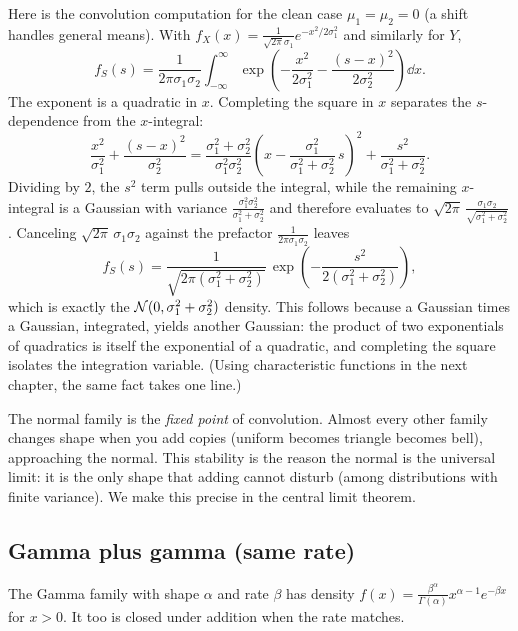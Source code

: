\begin{whybox}
Here is the convolution computation for the clean case
$\mu_1=\mu_2=0$ (a shift handles general means). With
$f_X(x)=\frac{1}{\sqrt{2\pi}\sigma_1}e^{-x^2/2\sigma_1^2}$ and similarly
for $Y$,
\[
f_S(s) = \frac{1}{2\pi\sigma_1\sigma_2}\int_{-\infty}^{\infty}
   \exp\!\left(-\frac{x^2}{2\sigma_1^2}-\frac{(s-x)^2}{2\sigma_2^2}\right)\dd x.
\]
The exponent is a quadratic in $x$. Completing the square in $x$ separates
the $s$-dependence from the $x$-integral:
\[
\frac{x^2}{\sigma_1^2} + \frac{(s-x)^2}{\sigma_2^2}
  = \frac{\sigma_1^2+\sigma_2^2}{\sigma_1^2\sigma_2^2}
    \left(x - \frac{\sigma_1^2}{\sigma_1^2+\sigma_2^2}\,s\right)^{\!2}
    + \frac{s^2}{\sigma_1^2+\sigma_2^2}.
\]
Dividing by $2$, the $s^2$ term pulls outside the integral, while the remaining
$x$-integral is a Gaussian with variance $\frac{\sigma_1^2\sigma_2^2}{\sigma_1^2+\sigma_2^2}$
and therefore evaluates to $\sqrt{2\pi}\,\frac{\sigma_1\sigma_2}{\sqrt{\sigma_1^2+\sigma_2^2}}$.
Canceling $\sqrt{2\pi}\,\sigma_1\sigma_2$ against the prefactor $\frac{1}{2\pi\sigma_1\sigma_2}$ leaves
\[
f_S(s) = \frac{1}{\sqrt{2\pi(\sigma_1^2+\sigma_2^2)}}\,
         \exp\!\left(-\frac{s^2}{2(\sigma_1^2+\sigma_2^2)}\right),
\]
which is exactly the $\mathcal{N}(0,\sigma_1^2+\sigma_2^2)$ density. This follows
because a Gaussian times a Gaussian, integrated, yields another Gaussian:
the product of two exponentials of quadratics is itself the exponential of a
quadratic, and completing the square isolates the integration variable. (Using
characteristic functions in the next chapter, the same fact takes one
line.)
\end{whybox}

\begin{aestheticbox}
The normal family is the \emph{fixed point} of convolution. Almost every
other family changes shape when you add copies (uniform becomes triangle
becomes bell), approaching the normal. This stability is the
reason the normal is the universal limit: it is the only shape that
adding cannot disturb (among distributions with finite variance). We make
this precise in the central limit theorem.
\end{aestheticbox}

\subsection{Gamma plus gamma (same rate)}

The Gamma family with shape $\alpha$ and rate $\beta$ has density
$f(x)=\frac{\beta^\alpha}{\Gamma(\alpha)}x^{\alpha-1}e^{-\beta x}$ for
$x>0$. It too is closed under addition when the rate matches.

